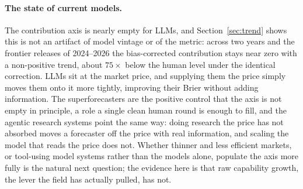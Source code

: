 \documentclass[11pt]{article}
\begin{document}
\paragraph{The state of current models.} The contribution axis is nearly empty for LLMs, and Section~\ref{sec:trend} shows this is not an artifact of model vintage or of the metric: across two years and the frontier releases of 2024--2026 the bias-corrected contribution stays near zero with a non-positive trend, about $75\times$ below the human level under the identical correction. LLMs sit at the market price, and supplying them the price simply moves them onto it more tightly, improving their Brier without adding information. The superforecasters are the positive control that the axis is not empty in principle, a role a single clean human round is enough to fill, and the agentic research systems point the same way: doing research the price has not absorbed moves a forecaster off the price with real information, and scaling the model that reads the price does not. Whether thinner and less efficient markets, or tool-using model systems rather than the models alone, populate the axis more fully is the natural next question; the evidence here is that raw capability growth, the lever the field has actually pulled, has not.
\end{document}
